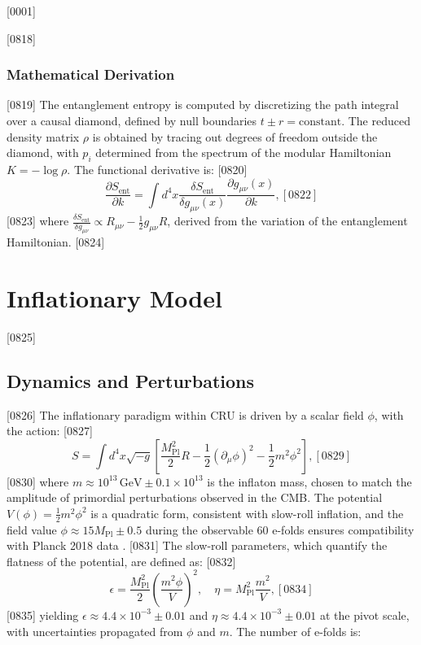 [0001] \documentclass[12pt]{report}
[0002] \usepackage[utf8]{inputenc}
\begin{document}
[0818] \subsection{Mathematical Derivation}
[0819] The entanglement entropy is computed by discretizing the path integral over a causal diamond, defined by null boundaries \(t \pm r = \text{constant}\). The reduced density matrix \(\rho\) is obtained by tracing out degrees of freedom outside the diamond, with \(p_i\) determined from the spectrum of the modular Hamiltonian \(K = -\log \rho\). The functional derivative is:
[0820] \begin{equation}
[0821] \frac{\partial S_{\text{ent}}}{\partial k} = \int d^4x \frac{\delta S_{\text{ent}}}{\delta g_{\mu\nu}(x)} \frac{\partial g_{\mu\nu}(x)}{\partial k},
[0822] \end{equation}
[0823] where \(\frac{\delta S_{\text{ent}}}{\delta g_{\mu\nu}} \propto R_{\mu\nu} - \frac{1}{2} g_{\mu\nu} R\), derived from the variation of the entanglement Hamiltonian.
[0824] \chapter{Inflationary Model}
[0825] \section{Dynamics and Perturbations}
[0826] The inflationary paradigm within CRU is driven by a scalar field \(\phi\), with the action:
[0827] \begin{equation}
[0828] S = \int d^4x \sqrt{-g} \left[ \frac{M_{\text{Pl}}^2}{2} R - \frac{1}{2} (\partial_\mu \phi)^2 - \frac{1}{2} m^2 \phi^2 \right],
[0829] \end{equation}
[0830] where \(m \approx 10^{13} \, \text{GeV} \pm 0.1 \times 10^{13}\) is the inflaton mass, chosen to match the amplitude of primordial perturbations observed in the CMB. The potential \(V(\phi) = \frac{1}{2} m^2 \phi^2\) is a quadratic form, consistent with slow-roll inflation, and the field value \(\phi \approx 15 M_{\text{Pl}} \pm 0.5\) during the observable 60 e-folds ensures compatibility with Planck 2018 data \citep{planck2018cosmology}.
[0831] The slow-roll parameters, which quantify the flatness of the potential, are defined as:
[0832] \begin{equation}
[0833] \epsilon = \frac{M_{\text{Pl}}^2}{2} \left( \frac{m^2 \phi}{V} \right)^2, \quad \eta = M_{\text{Pl}}^2 \frac{m^2}{V},
[0834] \end{equation}
[0835] yielding \(\epsilon \approx 4.4 \times 10^{-3} \pm 0.01\) and \(\eta \approx 4.4 \times 10^{-3} \pm 0.01\) at the pivot scale, with uncertainties propagated from \(\phi\) and \(m\). The number of e-folds is:
\end{document}
